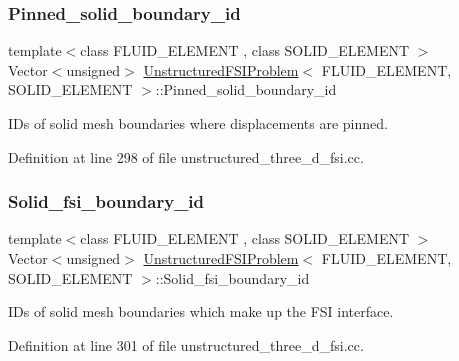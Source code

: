 \subsubsection{\texorpdfstring{Pinned\+\_\+solid\+\_\+boundary\+\_\+id}{Pinned\_solid\_boundary\_id}}
{\footnotesize\ttfamily template$<$class F\+L\+U\+I\+D\+\_\+\+E\+L\+E\+M\+E\+NT , class S\+O\+L\+I\+D\+\_\+\+E\+L\+E\+M\+E\+NT $>$ \\
Vector$<$unsigned$>$ \hyperlink{classUnstructuredFSIProblem}{Unstructured\+F\+S\+I\+Problem}$<$ F\+L\+U\+I\+D\+\_\+\+E\+L\+E\+M\+E\+NT, S\+O\+L\+I\+D\+\_\+\+E\+L\+E\+M\+E\+NT $>$\+::Pinned\+\_\+solid\+\_\+boundary\+\_\+id\hspace{0.3cm}{\ttfamily [private]}}



I\+Ds of solid mesh boundaries where displacements are pinned. 



Definition at line 298 of file unstructured\+\_\+three\+\_\+d\+\_\+fsi.\+cc.

\mbox{\label{classUnstructuredFSIProblem_a286830595411866cbbb3a43313d76285}} 
\subsubsection{\texorpdfstring{Solid\+\_\+fsi\+\_\+boundary\+\_\+id}{Solid\_fsi\_boundary\_id}}
{\footnotesize\ttfamily template$<$class F\+L\+U\+I\+D\+\_\+\+E\+L\+E\+M\+E\+NT , class S\+O\+L\+I\+D\+\_\+\+E\+L\+E\+M\+E\+NT $>$ \\
Vector$<$unsigned$>$ \hyperlink{classUnstructuredFSIProblem}{Unstructured\+F\+S\+I\+Problem}$<$ F\+L\+U\+I\+D\+\_\+\+E\+L\+E\+M\+E\+NT, S\+O\+L\+I\+D\+\_\+\+E\+L\+E\+M\+E\+NT $>$\+::Solid\+\_\+fsi\+\_\+boundary\+\_\+id\hspace{0.3cm}{\ttfamily [private]}}



I\+Ds of solid mesh boundaries which make up the F\+SI interface. 



Definition at line 301 of file unstructured\+\_\+three\+\_\+d\+\_\+fsi.\+cc.

